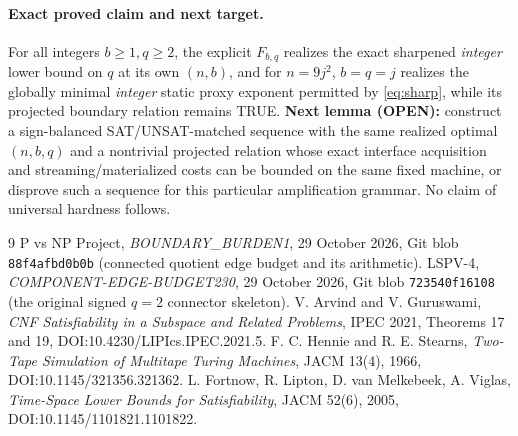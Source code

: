 \documentclass[10.5pt]{article}
\begin{document}
\paragraph{Exact proved claim and next target.}
For all integers $b\ge1,q\ge2$, the explicit $F_{b,q}$ realizes the exact sharpened \emph{integer} lower bound on $q$ at its own $(n,b)$, and for $n=9j^2$, $b=q=j$ realizes the globally minimal \emph{integer} static proxy exponent permitted by \eqref{eq:sharp}, while its projected boundary relation remains TRUE. \textbf{Next lemma (OPEN):} construct a sign-balanced SAT/UNSAT-matched sequence with the same realized optimal $(n,b,q)$ and a nontrivial projected relation whose exact interface acquisition and streaming/materialized costs can be bounded on the same fixed machine, or disprove such a sequence for this particular amplification grammar. No claim of universal hardness follows.

\begin{thebibliography}{9}
 P vs NP Project, \emph{BOUNDARY\_BURDEN1}, 29 October 2026, Git blob \texttt{88f4afbd0b0b} (connected quotient edge budget and its arithmetic).
 LSPV-4, \emph{COMPONENT-EDGE-BUDGET230}, 29 October 2026, Git blob \texttt{723540f16108} (the original signed $q=2$ connector skeleton).
 V. Arvind and V. Guruswami, \emph{CNF Satisfiability in a Subspace and Related Problems}, IPEC 2021, Theorems 17 and 19, DOI:10.4230/LIPIcs.IPEC.2021.5.
 F. C. Hennie and R. E. Stearns, \emph{Two-Tape Simulation of Multitape Turing Machines}, JACM 13(4), 1966, DOI:10.1145/321356.321362.
 L. Fortnow, R. Lipton, D. van Melkebeek, A. Viglas, \emph{Time-Space Lower Bounds for Satisfiability}, JACM 52(6), 2005, DOI:10.1145/1101821.1101822.
\end{thebibliography}
\end{document}
